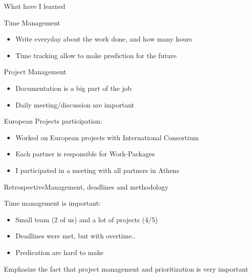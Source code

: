 \documentclass[10pt]{beamer}
\begin{document}
\begin{frame}{What have I learned}
\begin{block}{Time Management}
  \begin{itemize}
    \item Write everyday about the work done, and how many hours
    \item Time tracking allow to make prediction for the future
  \end{itemize}
\begin{block}{Project Management}
  \begin{itemize}
    \item Documentation is a big part of the job
    \item Daily meeting/discussion are important
  \end{itemize}
  \end{block}
\end{block}
\begin{block}{European Projects participation:}
  \begin{itemize}
    \item Worked on European projects with International Consortium
    \item Each partner is responsible for Work-Packages
    \item I participated in a meeting with all partners in Athens
  \end{itemize}
\end{block}

\end{frame}

\begin{frame}{Retrospective}{Management, deadlines and methodology}
\begin{block}{Time management is important:}
  \begin{itemize}
    \item Small team (2 of us) and a lot of projects (4/5)
    \item Deadlines were met, but with overtime..
    \item Predication are hard to make
  \end{itemize}

\end{block}

\begin{center}
  Emphasize the fact that project management and prioritization is very important
\end{center}
\end{frame}
\end{document}

